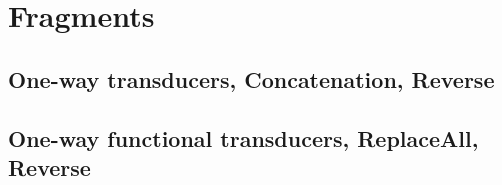 
\section{Fragments}\label{sec-frag}

\subsection{One-way transducers, Concatenation, Reverse}

\subsection{One-way functional transducers, ReplaceAll, Reverse}